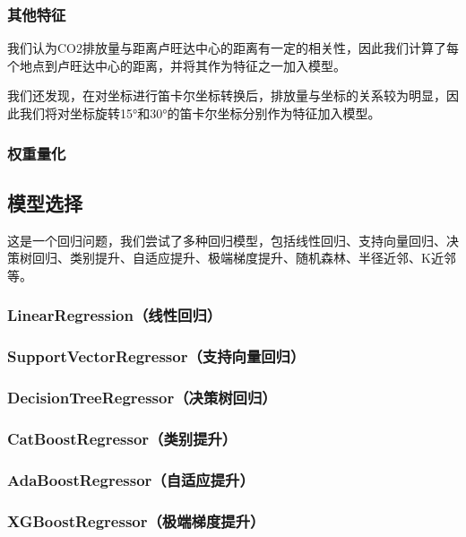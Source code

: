 \documentclass{ctexart}
\begin{document}
\subsubsection{其他特征}

我们认为CO2排放量与距离卢旺达中心的距离有一定的相关性，因此我们计算了每个地点到卢旺达中心的距离，并将其作为特征之一加入模型。

我们还发现，在对坐标进行笛卡尔坐标转换后，排放量与坐标的关系较为明显，因此我们将对坐标旋转15°和30°的笛卡尔坐标分别作为特征加入模型。

\subsubsection{权重量化}

\subsection{模型选择}

这是一个回归问题，我们尝试了多种回归模型，包括线性回归、支持向量回归、决策树回归、类别提升、自适应提升、极端梯度提升、随机森林、半径近邻、K近邻等。

\subsubsection{LinearRegression（线性回归）}

\subsubsection{SupportVectorRegressor（支持向量回归）}

\subsubsection{DecisionTreeRegressor（决策树回归）}

\subsubsection{CatBoostRegressor（类别提升）}

\subsubsection{AdaBoostRegressor（自适应提升）}

\subsubsection{XGBoostRegressor（极端梯度提升）}
\end{document}
